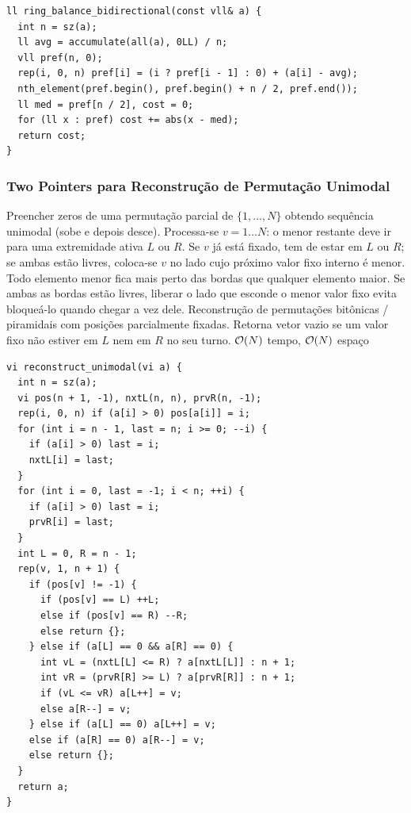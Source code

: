 \begin{lstlisting}
ll ring_balance_bidirectional(const vll& a) {
  int n = sz(a);
  ll avg = accumulate(all(a), 0LL) / n;
  vll pref(n, 0);
  rep(i, 0, n) pref[i] = (i ? pref[i - 1] : 0) + (a[i] - avg);
  nth_element(pref.begin(), pref.begin() + n / 2, pref.end());
  ll med = pref[n / 2], cost = 0;
  for (ll x : pref) cost += abs(x - med);
  return cost;
}
\end{lstlisting}

\subsubsection{Two Pointers para Reconstrução de Permutação Unimodal}
\algobox
  {Preencher zeros de uma permutação parcial de $\{1, \dots, N\}$ obtendo sequência unimodal (sobe e depois desce).}
  {Processa-se $v = 1 \dots N$: o menor restante deve ir para uma extremidade ativa $L$ ou $R$. Se $v$ já está fixado, tem de estar em $L$ ou $R$; se ambas estão livres, coloca-se $v$ no lado cujo próximo valor fixo interno é menor.}
  {Todo elemento menor fica mais perto das bordas que qualquer elemento maior. Se ambas as bordas estão livres, liberar o lado que esconde o menor valor fixo evita bloqueá-lo quando chegar a vez dele.}
  {Reconstrução de permutações bitônicas / piramidais com posições parcialmente fixadas.}
  {Retorna vetor vazio se um valor fixo não estiver em $L$ nem em $R$ no seu turno.}
  {$\mathcal{O}(N)$ tempo, $\mathcal{O}(N)$ espaço}

\begin{lstlisting}
vi reconstruct_unimodal(vi a) {
  int n = sz(a);
  vi pos(n + 1, -1), nxtL(n, n), prvR(n, -1);
  rep(i, 0, n) if (a[i] > 0) pos[a[i]] = i;
  for (int i = n - 1, last = n; i >= 0; --i) {
    if (a[i] > 0) last = i;
    nxtL[i] = last;
  }
  for (int i = 0, last = -1; i < n; ++i) {
    if (a[i] > 0) last = i;
    prvR[i] = last;
  }
  int L = 0, R = n - 1;
  rep(v, 1, n + 1) {
    if (pos[v] != -1) {
      if (pos[v] == L) ++L;
      else if (pos[v] == R) --R;
      else return {};
    } else if (a[L] == 0 && a[R] == 0) {
      int vL = (nxtL[L] <= R) ? a[nxtL[L]] : n + 1;
      int vR = (prvR[R] >= L) ? a[prvR[R]] : n + 1;
      if (vL <= vR) a[L++] = v;
      else a[R--] = v;
    } else if (a[L] == 0) a[L++] = v;
    else if (a[R] == 0) a[R--] = v;
    else return {};
  }
  return a;
}
\end{lstlisting}

